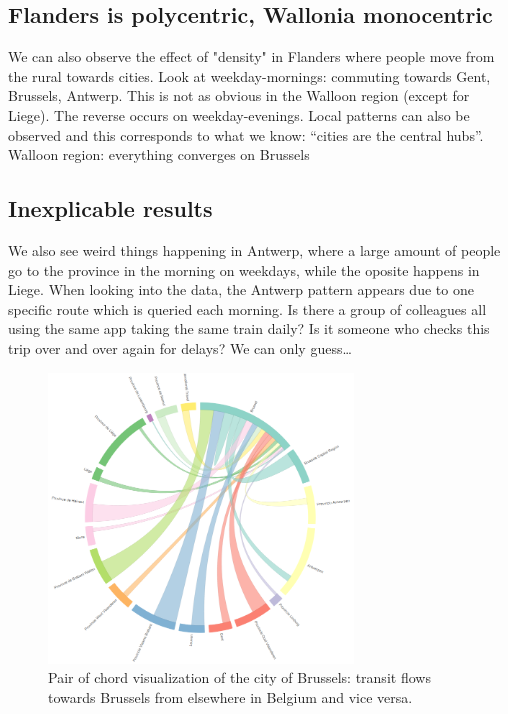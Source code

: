 \documentclass{sig-alternate}
\begin{document}
\subsection{Flanders is polycentric, Wallonia monocentric}

We can also observe the effect of "density" in Flanders where people move from the rural towards cities. Look at weekday-mornings: commuting towards Gent, Brussels, Antwerp. This is not as obvious in the Walloon region (except for Liege). The reverse occurs on weekday-evenings. Local patterns can also be observed and this corresponds to what we know: ``cities are the central hubs''.
Walloon region: everything converges on Brussels

\subsection{Inexplicable results}

We also see weird things happening in Antwerp, where a large amount of people go to the province in the morning on weekdays, while the oposite happens in Liege.
When looking into the data, the Antwerp pattern appears due to one specific route which is queried each morning.
Is there a group of colleagues all using the same app taking the same train daily?
Is it someone who checks this trip over and over again for delays?
We can only guess\ldots

\begin{figure}
\centering
\includegraphics[width=8.1cm,align=center]{brussels}
\caption{Pair of chord visualization of the city of Brussels: transit flows towards Brussels from elsewhere in Belgium and vice versa.}
\label{fig:brussels}
\end{figure}
\end{document}
